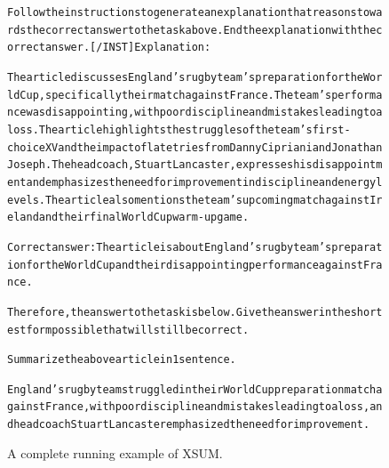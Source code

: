 \begin{figure}[t]
{{\begin{alltt}
Follow the instructions to generate an explanation that reasons towards the correct answer to the task above. End the explanation with the correct answer. [/INST] Explanation: 

The article discusses England's rugby team's preparation for the World Cup, specifically their match against France. The team's performance was disappointing, with poor discipline and mistakes leading to a loss. The article highlights the struggles of the team's first-choice XV and the impact of late tries from Danny Cipriani and Jonathan Joseph. The head coach, Stuart Lancaster, expresses his disappointment and emphasizes the need for improvement in discipline and energy levels. The article also mentions the team's upcoming match against Ireland and their final World Cup warm-up game.

Correct answer: The article is about England's rugby team's preparation for the World Cup and their disappointing performance against France.

Therefore, the answer to the task is below. Give the answer in the shortest form possible that will still be correct.

Summarize the above article in 1 sentence.

England's rugby team struggled in their World Cup preparation match against France, with poor discipline and mistakes leading to a loss, and head coach Stuart Lancaster emphasized the need for improvement.
\end{alltt}
}}
\caption{A complete running example of XSUM.}
\label{fig:summarization_xsum_example}
\end{figure}
